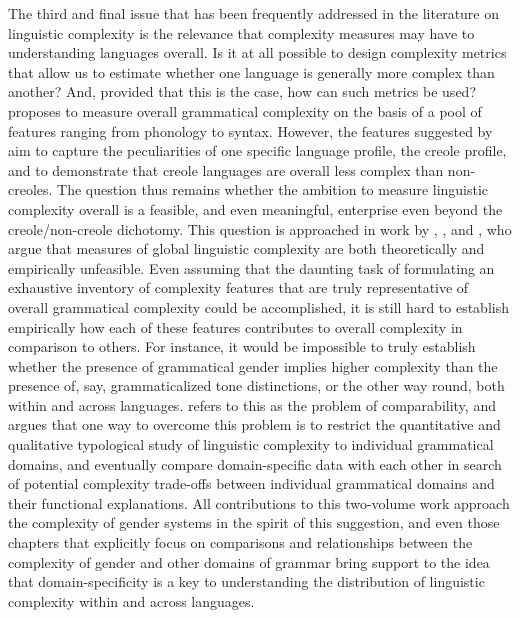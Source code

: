 \documentclass[output=collectionpaper]{langsci/langscibook}
\begin{document}
\largerpage
The third and final issue that has been frequently addressed in the literature on linguistic complexity is the relevance that complexity measures may have to understanding languages overall. Is it at all possible to design complexity metrics that allow us to estimate whether one language is generally more complex than another? And, provided that this is the case, how can such metrics be used? \citet{McWhorter2001} proposes to measure overall grammatical complexity on the basis of a pool of features ranging from phonology to syntax. However, the features suggested by \citet{McWhorter2001} aim to capture the peculiarities of one specific language profile, the creole profile, and to demonstrate that creole languages are overall less complex than non-creoles. The question thus remains whether the ambition to measure linguistic complexity overall is a feasible, and even meaningful, enterprise even beyond the creole/non-creole dichotomy. This question is approached in work by \citet{Miestamo2008}, \citet{Nichols2009}, and \citet{Sinnemaeki2014}, who argue that measures of global linguistic complexity are both theoretically and empirically unfeasible. Even assuming that the daunting task of formulating an exhaustive inventory of complexity features that are truly representative of overall grammatical complexity could be accomplished, it is still hard to establish empirically how each of these features contributes to overall complexity in comparison to others. For instance, it would be impossible to truly establish whether the presence of grammatical gender implies higher complexity than the presence of, say, grammaticalized tone distinctions, or the other way round, both within and across languages. \citet{Miestamo2008} refers to this as the problem of comparability, and argues that one way to overcome this problem is to restrict the quantitative and qualitative typological study of linguistic complexity to individual grammatical domains, and eventually compare domain-specific data with each other in search of potential complexity trade-offs between individual grammatical domains and their functional explanations. All contributions to this two-volume work approach the complexity of gender systems in the spirit of this suggestion, and even those chapters that explicitly focus on comparisons and relationships between the complexity of gender and other domains of grammar bring support to the idea that domain-specificity is a key to understanding the distribution of linguistic complexity within and across languages.
\end{document}
